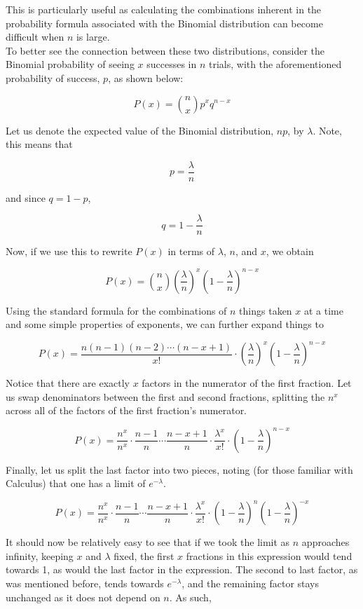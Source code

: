 This is particularly useful as calculating the combinations inherent in the probability formula associated with the Binomial distribution can become difficult when \( n \) is large.\\

To better see the connection between these two distributions, consider the Binomial probability of seeing \( x \) successes in \( n \) trials, with the aforementioned probability of success, \( p \), as shown below:

\[
P(x) = \binom{n}{x} p^x q^{n-x}
\]

Let us denote the expected value of the Binomial distribution, \( np \), by \( \lambda \). Note, this means that

\[
p = \frac{\lambda}{n}
\]

and since \( q = 1 - p \),

\[
q = 1 - \frac{\lambda}{n}
\]

Now, if we use this to rewrite \( P(x) \) in terms of \( \lambda \), \( n \), and \( x \), we obtain

\[
P(x) = \binom{n}{x} \left( \frac{\lambda}{n} \right)^x \left( 1 - \frac{\lambda}{n} \right)^{n-x}
\]

Using the standard formula for the combinations of \( n \) things taken \( x \) at a time and some simple properties of exponents, we can further expand things to

\[
P(x) = \frac{n(n-1)(n-2) \cdots (n-x+1)}{x!} \cdot \left( \frac{\lambda}{n} \right)^x \left( 1 - \frac{\lambda}{n} \right)^{n-x}
\]

Notice that there are exactly \( x \) factors in the numerator of the first fraction. Let us swap denominators between the first and second fractions, splitting the \( n^x \) across all of the factors of the first fraction's numerator.

\[
P(x) = \frac{n^x}{n^x} \cdot \frac{n-1}{n} \cdots \frac{n-x+1}{n} \cdot \frac{\lambda^x}{x!} \cdot \left( 1 - \frac{\lambda}{n} \right)^{n-x}
\]

Finally, let us split the last factor into two pieces, noting (for those familiar with Calculus) that one has a limit of \( e^{-\lambda} \).

\[
P(x) = \frac{n^x}{n^x} \cdot \frac{n-1}{n} \cdots \frac{n-x+1}{n} \cdot \frac{\lambda^x}{x!} \cdot \left( 1 - \frac{\lambda}{n} \right)^{n} \left( 1 - \frac{\lambda}{n} \right)^{-x}
\]

It should now be relatively easy to see that if we took the limit as \( n \) approaches infinity, keeping \( x \) and \( \lambda \) fixed, the first \( x \) fractions in this expression would tend towards 1, as would the last factor in the expression. The second to last factor, as was mentioned before, tends towards \( e^{-\lambda} \), and the remaining factor stays unchanged as it does not depend on \( n \). As such,

